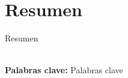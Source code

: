 \cleardoublepage
\chapter*{Resumen}

Resumen

\\[2.0cm]

\textbf{\small Palabras clave:} Palabras clave\\